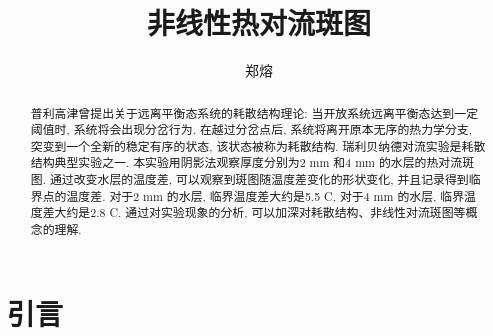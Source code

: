 \documentclass[font=default]{mpltx}
\makeatletter
\newcommand{\note}[1]{{\color{gray}#1}}
\newcommand*\file[1]{\textbf{\texttt{#1}}}
\newcommand\releasedate{%
    \href{https://github.com/CastleStar14654/PKUMpLtX/releases/tag/\mpltx@fileversion}%
        {\mpltx@filedate, \mpltx@fileversion}}
\makeatother
\begin{document}
\title{非线性热对流斑图} %
\author{郑熔} %
\date{}
\begin{abstract}
  普利高津曾提出关于远离平衡态系统的耗散结构理论: 当开放系统远离平衡态达到一定阈值时, 系统将会出现分岔行为. 在越过分岔点后, 系统将离开原本无序的热力学分支, 突变到一个全新的稳定有序的状态,
  该状态被称为耗散结构.
  瑞利贝纳德对流实验是耗散结构典型实验之一.
  本实验用阴影法观察厚度分别为2 mm 和4 mm 的水层的热对流斑图. 通过改变水层的温度差, 可以观察到斑图随温度差变化的形状变化, 并且记录得到临界点的温度差. 对于2 mm 的水层, 
  临界温度差大约是5.5 \circ C, 对于4 mm 的水层, 临界温度差大约是2.8 \circ C. 通过对实验现象的分析, 可以加深对耗散结构、非线性对流斑图等概念的理解.
 
\end{abstract}

\maketitle

\section{引言}
\end{document}

